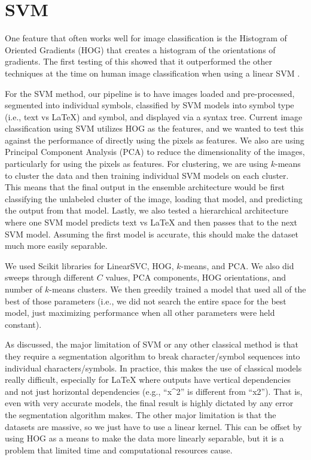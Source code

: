 \documentclass[11pt]{article}
\begin{document}
\section{SVM}

One feature that often works well for image classification is the Histogram of Oriented Gradients (HOG) that creates a histogram of the orientations of gradients. The first testing of this showed that it outperformed the other techniques at the time on human image classification when using a linear SVM \citep{dalal1467360}.

For the SVM method, our pipeline is to have images loaded and pre-processed, segmented into individual symbols, classified by SVM models into symbol type (i.e., text vs LaTeX) and symbol, and displayed via a syntax tree. Current image classification using SVM utilizes HOG as the features, and we wanted to test this against the performance of directly using the pixels as features. We also are using Principal Component Analysis (PCA) to reduce the dimensionality of the images, particularly for using the pixels as features. For clustering, we are using $k$-means to cluster the data and then training individual SVM models on each cluster. This means that the final output in the ensemble architecture would be first classifying the unlabeled cluster of the image, loading that model, and predicting the output from that model. Lastly, we also tested a hierarchical architecture where one SVM model predicts text vs LaTeX and then passes that to the next SVM model. Assuming the first model is accurate, this should make the dataset much more easily separable.

We used Scikit libraries for LinearSVC, HOG, $k$-means, and PCA. We also did sweeps through different $C$ values, PCA components, HOG orientations, and number of $k$-means clusters. We then greedily trained a model that used all of the best of those parameters (i.e., we did not search the entire space for the best model, just maximizing performance when all other parameters were held constant).

As discussed, the major limitation of SVM or any other classical method is that they require a segmentation algorithm to break character/symbol sequences into individual characters/symbols. In practice, this makes the use of classical models really difficult, especially for LaTeX where outputs have vertical dependencies and not just horizontal dependencies (e.g., ``x\textasciicircum2'' is different from ``x2''). That is, even with very accurate models, the final result is highly dictated by any error the segmentation algorithm makes. The other major limitation is that the datasets are massive, so we just have to use a linear kernel. This can be offset by using HOG as a means to make the data more linearly separable, but it is a problem that limited time and computational resources cause.
\end{document}
